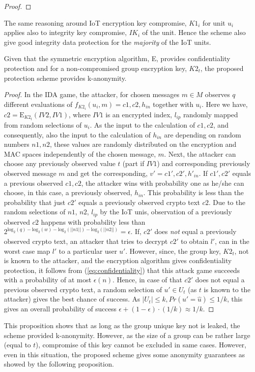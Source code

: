 {\begin{proof}
\end{proof}
The same reasoning around IoT encryption key compromise, $K1_i$ for unit $u_i$ applies also to integrity key compromise, $IK_i$ of the unit. Hence the scheme also give good integrity data protection for the \textit{majority} of the IoT units. 
\begin{prop}
\label{analysis:kanonymity}
 Given that the symmetric encryption algorithm, E, provides confidentiality protection and for a non-compromised group encryption key, $K2_t$, the proposed protection scheme provides k-anonymity.
\end{prop}
\begin{proof}
 In the IDA game, the attacker, for chosen messages $m \in M$ observes $q$ different evaluations of  $f_{K2_i}(u_i,m) = c1,c2,h_{in}$ together with $u_i$. Here we have, $c2 = \text{E}_{K2_t}(IV2,IV1)$, where $IV1$ is an encrypted index, $l_{ip}$ randomly mapped from random selections of $u_i$. As the input to the calculation of $c1,c2$, and consequently, also the input to the calculation of $h_{in}$ are depending on random numbers $n1,n2$, these values are randomly distributed on the encryption and MAC spaces independently of the chosen message, $m$. Next, the attacker can choose any previously observed value $t$ (part if $IV1$) and corresponding previously observed message $m$ and get the corresponding, $v' = c1',c2',h'_{in}$. If $c1',c2'$ equals a previous observed $c1,c2$, the attacker wins with probability one as he/she can choose, in this case, a previously observed, $h_{in}$. This probability is less than  the probability that just $c2'$ equals a previously observed crypto text $c2$.  Due to the random selections of $n1$, $n2$, $l_{ip}$ by the IoT unis, observation of a previously observed $c2$ happens with probability less than $2^{\text{log}_2(q) - \text{log}_2(w) - \text{log}_2(||n1||) -\text{log}_2(||n2||)} = \epsilon$. If, $c2'$ does \textit{not} equal a previously observed crypto text, an attacker that tries to decrypt $c2'$ to obtain $l'$, can in the worst case map $l'$ to a particular user $u'$. However, since, the group key, $K2_t$, not is known to the attacker, and the encryption algorithm gives confidentiality protection, it follows from (\ref{eq:confidentiality}) that this attack game succeeds with a probability of at most $\epsilon(n)$. Hence, in case of that $c2'$ does not equal a previous observed crypto text, a random selection of $u' \in U_t$ (as $t$ is known to the attacker) gives the best chance of success. As $|U_t| \leq k, Pr(u'= \hat{u}) \leq 1/k $, this gives an overall probability of success $\epsilon +(1-\epsilon)\cdot(1/k) \approx 1/k$.
\end{proof}
This proposition shows that as long as the group unique key not is leaked, the scheme provided k-anonymity. However, as the size of a group can be rather large  (equal to $t$), compromise of this key cannot be excluded in same cases. However, even in this situation, the proposed scheme gives some anonymity guarantees as showed by the following proposition.

}
